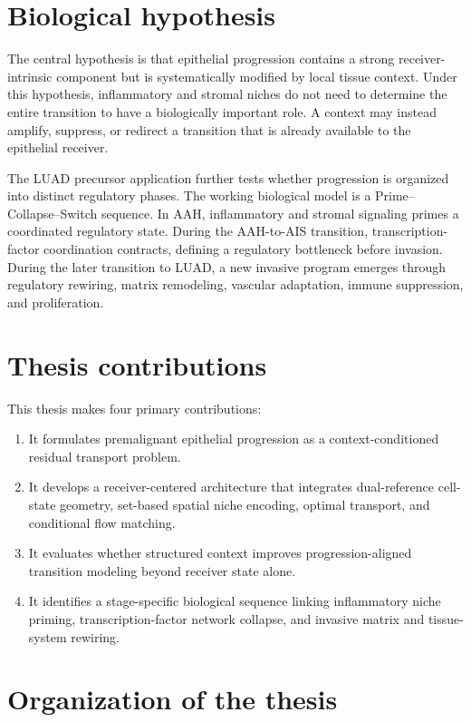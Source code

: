 \section{Biological hypothesis}

The central hypothesis is that epithelial progression contains a strong receiver-intrinsic component but is systematically modified by local tissue context. Under this hypothesis, inflammatory and stromal niches do not need to determine the entire transition to have a biologically important role. A context may instead amplify, suppress, or redirect a transition that is already available to the epithelial receiver.

The LUAD precursor application further tests whether progression is organized into distinct regulatory phases. The working biological model is a Prime--Collapse--Switch sequence. In AAH, inflammatory and stromal signaling primes a coordinated regulatory state. During the AAH-to-AIS transition, transcription-factor coordination contracts, defining a regulatory bottleneck before invasion. During the later transition to LUAD, a new invasive program emerges through regulatory rewiring, matrix remodeling, vascular adaptation, immune suppression, and proliferation.

\section{Thesis contributions}

This thesis makes four primary contributions:

\begin{enumerate}
    \item It formulates premalignant epithelial progression as a context-conditioned residual transport problem.
    \item It develops a receiver-centered architecture that integrates dual-reference cell-state geometry, set-based spatial niche encoding, optimal transport, and conditional flow matching.
    \item It evaluates whether structured context improves progression-aligned transition modeling beyond receiver state alone.
    \item It identifies a stage-specific biological sequence linking inflammatory niche priming, transcription-factor network collapse, and invasive matrix and tissue-system rewiring.
\end{enumerate}

\section{Organization of the thesis}

